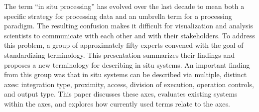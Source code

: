 
\license


The term ``in situ processing'' has evolved over the last decade to mean both a specific strategy for processing data and an umbrella term for a processing paradigm. The resulting confusion makes it difficult for visualization and analysis scientists to communicate with each other and with their stakeholders. To address this problem, a group of approximately fifty experts convened with the goal of standardizing terminology. This presentation summarizes their findings and proposes a new terminology for describing in situ systems. An important finding from this group was that in situ systems can be described via multiple, distinct axes: integration type, proximity, access, division of execution, operation controls, and output type. This paper discusses these axes, evaluates existing systems within
the axes, and explores how currently used terms relate to the axes.

